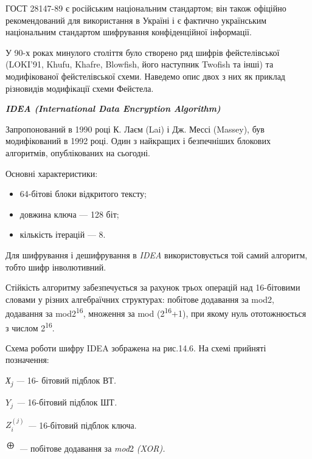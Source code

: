 \bigskip


\bigskip

ГОСТ 28147-89 є російським національним стандартом; він також офіційно
рекомендований для використання в Україні і є фактично українським національним
стандартом шифрування конфіденційної інформації.


\bigskip

У 90-х роках минулого століття було створено ряд шифрів фейстелівської (LOKI’91,
Khufu, Khafre, Blowfish, його наступник Twofish та інші) та модифікованої
фейстелівської схеми.  Наведемо опис двох з них як приклад різновидів
модифікації схеми Фейстела.\textbf{\textit{ }}


\bigskip


\bigskip

{\centering\bfseries\itshape
IDEA (International Data Encryption Algorithm)
\par}


\bigskip

Запропонований в 1990 році К. Лаєм (Lai) і Дж. Мессі (Massey), був модифікований
в 1992 році. Один з найкращих і безпечніших блокових алгоритмів, опублікованих
на сьогодні.

Основні характеристики:

\liststyleWWviiiNumxlvi
\begin{itemize}
\item 64-бітові блоки відкритого тексту;
\item довжина ключа --- 128 біт;
\item кількість ітерацій --- 8.
\end{itemize}
Для шифрування і дешифрування в \textit{IDEA} використовується той самий
алгоритм, тобто шифр інволютивний.

Стійкість алгоритму забезпечується за рахунок трьох операцій над 16-бітовими
словами у різних алгебраїчних структурах: побітове додавання за mod2, додавання
за mod2\textsuperscript{16}, множення за mod (2\textsuperscript{16}+1), при
якому нуль ототожнюється з числом 2\textsuperscript{16}.

Схема роботи шифру IDEA зображена на рис.14.6. На схемі прийняті позначення:

\textit{Х}\textit{\textsubscript{j}}\textit{ ---} 16- бітовий підблок ВТ\textit{.}

 ${Y_{{j}}}$\textit{ --- }16-бітовий підблок ШТ\textit{.}

 ${Z_{{i}}^{{(j)}}}$\textit{ --- }16-бітовий підблок ключа.

 \includegraphics[width=0.1807in,height=0.1937in]{crypt-img/crypt-img299.png}
\textit{ ---} побітове додавання за\textit{ }\textit{mod}2\textit{
(}\textit{XOR}\textit{).}

